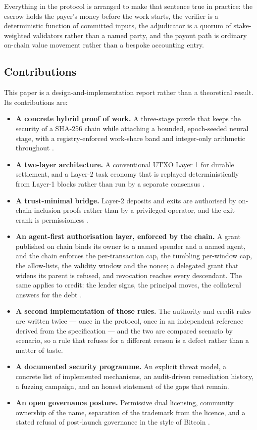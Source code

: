 \documentclass{article}
\begin{document}
Everything in the protocol is arranged to make that sentence true in practice:
the escrow holds the payer's money before the work starts, the verifier is a
deterministic function of committed inputs, the adjudicator is a quorum of
stake-weighted validators rather than a named party, and the payout path is
ordinary on-chain value movement rather than a bespoke accounting entry.

\subsection{Contributions}

This paper is a design-and-implementation report rather than a theoretical
result. Its contributions are:

\begin{itemize}
\item \textbf{A concrete hybrid proof of work.} A three-stage puzzle that keeps
the security of a SHA-256 chain while attaching a bounded, epoch-seeded neural
stage, with a registry-enforced work-share band and integer-only arithmetic
throughout \cite{zawy2019darkgravity,cryptonote2012whitepaper}.
\item \textbf{A two-layer architecture.} A conventional UTXO Layer 1 for durable
settlement, and a Layer-2 task economy that is replayed deterministically from
Layer-1 blocks rather than run by a separate consensus \cite{dwork2012mining,
trivedi2017sok}.
\item \textbf{A trust-minimal bridge.} Layer-2 deposits and exits are authorised
by on-chain inclusion proofs rather than by a privileged operator, and the exit
crank is permissionless \cite{wood2014decentralized}.
\item \textbf{An agent-first authorisation layer, enforced by the chain.} A grant
published on chain binds its owner to a named spender and a named agent, and
the chain enforces the per-transaction cap, the tumbling per-window cap, the
allow-lists, the validity window and the nonce; a delegated grant that widens
its parent is refused, and revocation reaches every descendant. The same
applies to credit: the lender signs, the principal moves, the collateral
answers for the debt \cite{yao2023survey}.
\item \textbf{A second implementation of those rules.} The authority and credit
rules are written twice --- once in the protocol, once in an independent
reference derived from the specification --- and the two are compared scenario
by scenario, so a rule that refuses for a different reason is a defect rather
than a matter of taste.
\item \textbf{A documented security programme.} An explicit threat model, a
concrete list of implemented mechanisms, an audit-driven remediation history, a
fuzzing campaign, and an honest statement of the gaps that remain.
\item \textbf{An open governance posture.} Permissive dual licensing, community
ownership of the name, separation of the trademark from the licence, and a stated
refusal of post-launch governance in the style of Bitcoin
\cite{nakamoto2008bitcoin,bonneau2018sok}.
\end{itemize}
\end{document}
